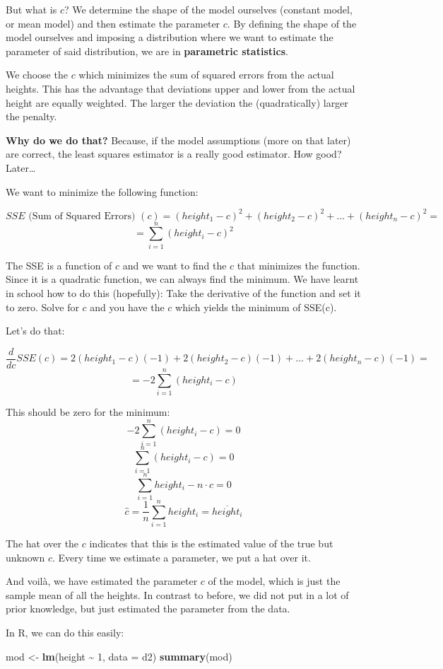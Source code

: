 \documentclass[
]{book}
\newenvironment{Shaded}{\begin{snugshade}}{\end{snugshade}}
\newcommand{\AttributeTok}[1]{\textcolor[rgb]{0.13,0.29,0.53}{#1}}
\newcommand{\DecValTok}[1]{\textcolor[rgb]{0.00,0.00,0.81}{#1}}
\newcommand{\FunctionTok}[1]{\textcolor[rgb]{0.13,0.29,0.53}{\textbf{#1}}}
\newcommand{\NormalTok}[1]{#1}
\newcommand{\OtherTok}[1]{\textcolor[rgb]{0.56,0.35,0.01}{#1}}
\newcommand{\SpecialCharTok}[1]{\textcolor[rgb]{0.81,0.36,0.00}{\textbf{#1}}}
\begin{document}
But what is \(c\)? We determine the shape of the model
ourselves (constant model, or mean model) and then estimate the parameter \(c\).
By defining the shape of the model ourselves and imposing a distribution where we want to
estimate the parameter of said distribution, we are in \textbf{parametric statistics}.

We choose the \(c\) which minimizes the sum of squared errors from the actual heights.
This has the advantage that deviations upper and lower from the actual height are
equally weighted. The larger the deviation the (quadratically) larger the penalty.

\textbf{Why do we do that?} Because, if the model assumptions (more on that later)
are correct, the least squares
estimator is a really good estimator. How good? Later\ldots{}

We want to minimize the following function:

\[ SSE \text{ (Sum of Squared Errors) }(c) = (height_1 - c)^2 + (height_2 - c)^2 + 
\ldots + (height_n - c)^2 =\]
\[ = \sum_{i=1}^{n} (height_i - c)^2\]

The SSE is a function of \(c\) and we want to find the \(c\) that minimizes the function.
Since it is a quadratic function, we can always find the minimum.
We have learnt in school how to do this (hopefully): Take the derivative of the function
and set it to zero. Solve for \(c\) and you have the \(c\) which yields the minimum of SSE(c).

Let's do that:

\[ \frac{d}{dc} SSE(c) =  2(height_1 - c)(-1) + 2(height_2 - c)(-1) + 
\ldots + 2(height_n - c)(-1) =\]
\[ = -2 \sum_{i=1}^{n} (height_i - c)\]

This should be zero for the minimum:
\[ -2 \sum_{i=1}^{n} (height_i - c) = 0\]
\[ \sum_{i=1}^{n} (height_i - c) = 0\]
\[ \sum_{i=1}^{n} height_i - n \cdot c = 0\]
\[ \hat{c} = \frac{1}{n} \sum_{i=1}^{n} height_i = \overline{height_i}\]

The hat over the \(c\) indicates that this is the estimated value of the
true but unknown \(c\).
Every time we estimate a parameter, we put a hat over it.

And voilà, we have estimated the parameter \(c\) of the model, which is just the
sample mean of all the heights. In contrast to before, we did not put
in a lot of prior knowledge, but just estimated the parameter from the data.

In R, we can do this easily:

\begin{Shaded}
\begin{Highlighting}[]
\NormalTok{mod }\OtherTok{\textless{}{-}} \FunctionTok{lm}\NormalTok{(height }\SpecialCharTok{\textasciitilde{}} \DecValTok{1}\NormalTok{, }\AttributeTok{data =}\NormalTok{ d2)}
\FunctionTok{summary}\NormalTok{(mod)}
\end{Highlighting}
\end{Shaded}
\end{document}
